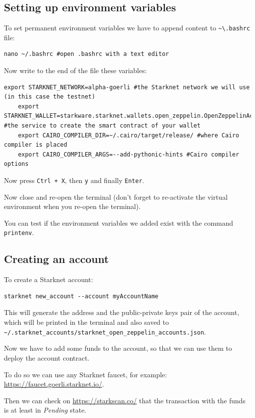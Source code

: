 \documentclass[12pt]{article}
\begin{document}
\subsection{Setting up environment variables}
To set permanent environment variables we have to append content to \verb|~\.bashrc| file:
\begin{lstlisting}[language=terminal]
    nano ~/.bashrc #open .bashrc with a text editor
\end{lstlisting}

Now write to the end of the file these variables:
\begin{lstlisting}[language=terminal]
    export STARKNET_NETWORK=alpha-goerli #the Starknet network we will use (in this case the testnet)
    export STARKNET_WALLET=starkware.starknet.wallets.open_zeppelin.OpenZeppelinAccount #the service to create the smart contract of your wallet
    export CAIRO_COMPILER_DIR=~/.cairo/target/release/ #where Cairo compiler is placed
    export CAIRO_COMPILER_ARGS=--add-pythonic-hints #Cairo compiler options
\end{lstlisting}

Now press \verb|Ctrl + X|, then \verb|y| and finally \verb|Enter|.

Now close and re-open the terminal (don't forget to re-activate the virtual environment when you re-open the terminal).

You can test if the environment variables we added exist with the command \verb|printenv|.

\subsection{Creating an account}
To create a Starknet account:
\begin{lstlisting}[language=terminal]
    starknet new_account --account myAccountName
\end{lstlisting}

This will generate the address and the public-private keys pair of the account, which will be printed in the terminal and also saved to\\\verb|~/.starknet_accounts/starknet_open_zeppelin_accounts.json|.

Now we have to add some funds to the account, so that we can use them to deploy the account contract.

To do so we can use any Starknet faucet, for example: \url{https://faucet.goerli.starknet.io/}.

Then we can check on \url{https://starkscan.co/} that the transaction with the funds is at least in \emph{Pending} state.
\end{document}
